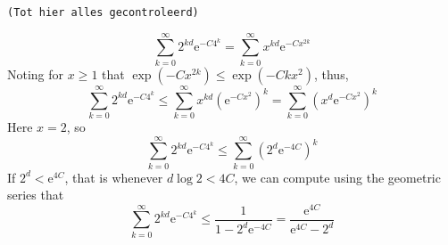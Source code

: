 \documentclass{amsart}
\theoremstyle{remark}
\renewcommand{\leq}{\leqslant}
\renewcommand{\leq}{\leqslant}
\renewcommand{\geq}{\geqslant}
\newcommand{\e}{\mathrm{e}} %
\renewcommand{\leq}{\leqslant}%
\renewcommand{\geq}{\geqslant}%
\newcommand{\red}{\color{red}}
\begin{document}
  \begin{center}

  {\tt \red (Tot hier alles gecontroleerd)}
  
  \end{center}

  
  \begin{equation*}
    \sum_{k = 0}^\infty 2^{kd} \e^{-C 4^k} = \sum_{k = 0}^\infty x^{kd} \e^{-C x^{2k}}
  \end{equation*}
  Noting for $x \geq 1$ that $\exp(-C x^{2k}) \leq \exp(-C k x^2)$,
  thus,
  \begin{equation*}
    \sum_{k = 0}^\infty 2^{kd} \e^{-C 4^k} \leq \sum_{k = 0}^\infty
    x^{kd} (\e^{-C x^2})^k = \sum_{k = 0}^\infty (x^{d} \e^{-C x^2})^k
  \end{equation*}
  Here $x = 2$, so
  \begin{equation*}
    \sum_{k = 0}^\infty 2^{kd} \e^{-C 4^k} \leq \sum_{k = 0}^\infty
    (2^d \e^{-4 C})^k
  \end{equation*}
  If $2^d < \e^{4C}$, that is whenever $d \log 2 < 4C$, we can compute
  using the geometric series that
  \begin{equation*}
    \sum_{k = 0}^\infty 2^{kd} \e^{-C 4^k} \leq \frac1{1 - 2^d
      \e^{-4C}} = \frac{\e^{4C}}{\e^{4C} - 2^d}
  \end{equation*}



\end{document}
